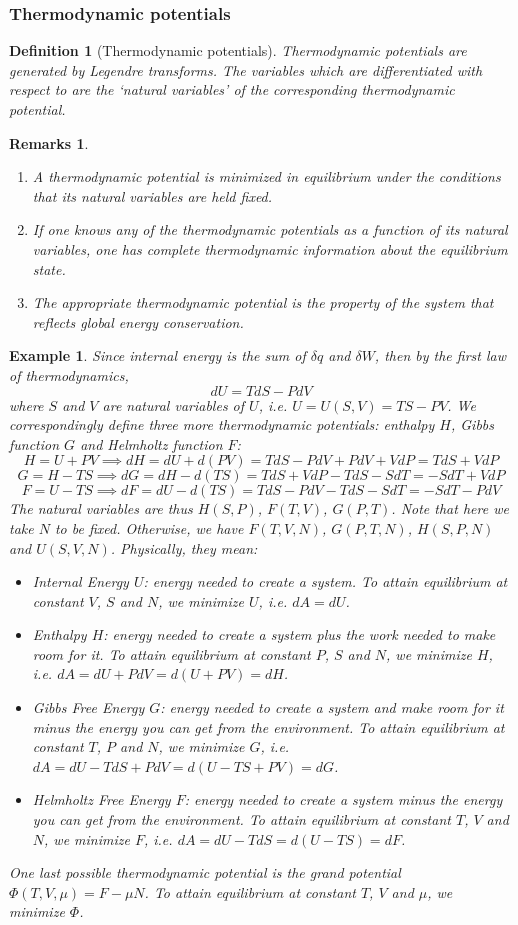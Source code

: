 \documentclass[a4paper]{article}
\newtheorem{eg}{Example}[section]
\newtheorem{remarks}{Remarks}[section]
\theoremstyle{new}
\newtheorem{defi}{Definition}[section]
\begin{document}
\subsubsection*{Thermodynamic potentials}
\begin{defi}[Thermodynamic potentials]
Thermodynamic potentials are generated by Legendre transforms. The variables which are differentiated with respect to are the `natural variables' of the corresponding thermodynamic potential.
\end{defi}
\begin{remarks}\leavevmode
\begin{enumerate}
    \item A thermodynamic potential is minimized in equilibrium under the conditions that its natural variables are held fixed.
    \item If one knows any of the thermodynamic potentials as a function of its natural variables, one has complete thermodynamic information about the equilibrium state.
    \item The appropriate thermodynamic potential is the property of the system that reflects global energy conservation.
\end{enumerate}
\end{remarks}
\begin{eg}
Since internal energy is the sum of $\delta q$ and $\delta W$, then by the first law of thermodynamics,
$$dU=TdS-PdV$$
where $S$ and $V$ are natural variables of $U$, i.e. $U=U(S,V)=TS-PV$. We correspondingly define three more thermodynamic potentials: enthalpy $H$, Gibbs function $G$ and Helmholtz function $F$:
$$H=U+PV\implies dH=dU+d(PV)=TdS-PdV+PdV+VdP=TdS+VdP$$
$$G=H-TS\implies dG=dH-d(TS)=TdS+VdP-TdS-SdT=-SdT+VdP$$
$$F=U-TS\implies dF=dU-d(TS)=TdS-PdV-TdS-SdT=-SdT-PdV$$
The natural variables are thus $H(S,P)$, $F(T,V)$, $G(P,T)$. Note that here we take $N$ to be fixed. Otherwise, we have $F(T,V,N)$, $G(P,T,N)$, $H(S,P,N)$ and $U(S,V,N)$. Physically, they mean:
\begin{itemize}
    \item Internal Energy $U$: energy needed to create a system. To attain equilibrium at constant $V$, $S$ and $N$, we minimize $U$, i.e. $dA=dU$.
    \item Enthalpy $H$: energy needed to create a system plus the work needed to make room for it. To attain equilibrium at constant $P$, $S$ and $N$, we minimize $H$, i.e. $dA=dU+PdV=d(U+PV)=dH$.
    \item Gibbs Free Energy $G$: energy needed to create a system and make room for it minus the energy you can get from the environment. To attain equilibrium at constant $T$, $P$ and $N$, we minimize $G$, i.e. $dA=dU-TdS+PdV=d(U-TS+PV)=dG$.
    \item Helmholtz Free Energy $F$: energy needed to create a system minus the energy you can get from the environment. To attain equilibrium at constant $T$, $V$ and $N$, we minimize $F$, i.e. $dA=dU-TdS=d(U-TS)=dF$.
\end{itemize}
One last possible thermodynamic potential is the grand potential $\Phi(T,V,\mu)=F-\mu N$. To attain equilibrium at constant $T$, $V$ and $\mu$, we minimize $\Phi$.
\end{eg}
\end{document}
